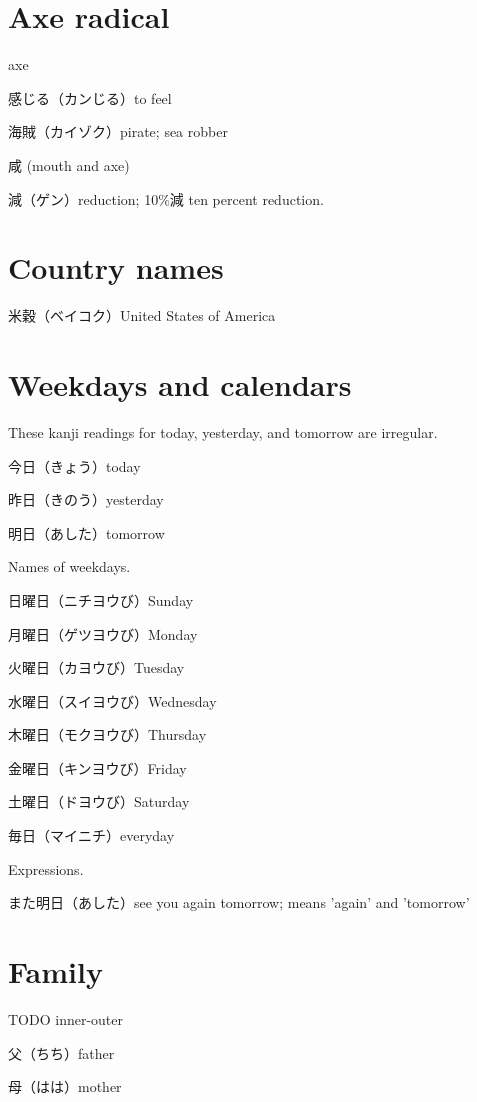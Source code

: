\section{Axe radical}

axe

感じる（カンじる）to feel

海賊（カイゾク）pirate; sea robber

咸 (mouth and axe)

減（ゲン）reduction; 10\%減 ten percent reduction.

\section{Country names}

米穀（ベイコク）United States of America

\section{Weekdays and calendars}

These kanji readings for today, yesterday, and tomorrow are irregular.

今日（きょう）today

昨日（きのう）yesterday

明日（あした）tomorrow

Names of weekdays.

日曜日（ニチヨウび）Sunday

月曜日（ゲツヨウび）Monday

火曜日（カヨウび）Tuesday

水曜日（スイヨウび）Wednesday

木曜日（モクヨウび）Thursday

金曜日（キンヨウび）Friday

土曜日（ドヨウび）Saturday

毎日（マイニチ）everyday

Expressions.

また明日（あした）see you again tomorrow; means 'again' and 'tomorrow'

\section{Family}

TODO inner-outer

父（ちち）father

母（はは）mother
